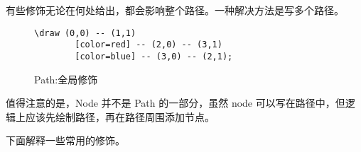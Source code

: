 有些修饰无论在何处给出，都会影响整个路径。一种解决方法是写多个路径。

\begin{figure}[H]
    \centering
    \begin{minipage}{0.35\linewidth}
        \centering
    \end{minipage}
    \begin{minipage}{0.55\linewidth}
        \begin{lstlisting}[style = latex-side]
    \draw (0,0) -- (1,1)
        [color=red] -- (2,0) -- (3,1)
        [color=blue] -- (3,0) -- (2,1);
        \end{lstlisting}
    \end{minipage}
    \caption{Path:全局修饰}
\end{figure}

值得注意的是，Node 并不是 Path 的一部分，虽然 node 可以写在路径中，但逻辑上应该先绘制路径，再在路径周围添加节点。

下面解释一些常用的修饰。

